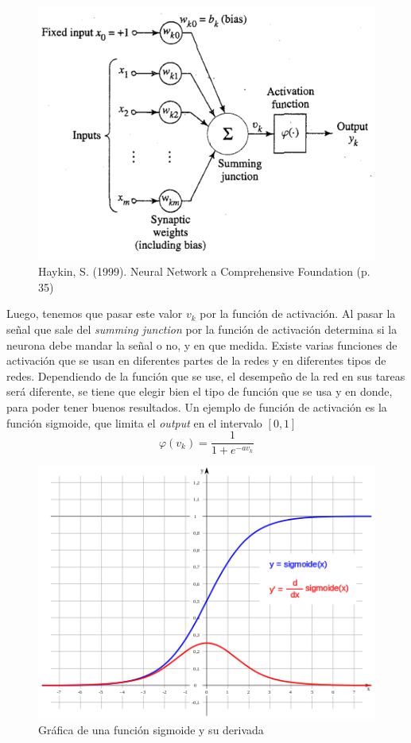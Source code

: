 \documentclass[14pt,a4paper]{report}
\begin{document}
 \begin{figure}[h]
  \centering
  \includegraphics[scale=0.8]{../artificial-neural-fixed-input.png} 
  \caption{Haykin, S. (1999). Neural Network a Comprehensive Foundation (p. 35)}
  \label{fig:neural-network}
\end{figure}


Luego, tenemos que pasar este valor $v_{k}$ por la función de activación. Al pasar la señal que sale del \textit{summing junction} por la función de activación determina si la neurona debe mandar la señal o no, y en que medida. Existe varias funciones de activación que se usan en diferentes partes de la redes y en diferentes tipos de redes. Dependiendo de la función que se use, el desempeño de la red en sus tareas será diferente, se tiene que elegir bien el tipo de función que se usa y en donde, para poder tener buenos resultados. Un ejemplo de función de activación es la función sigmoide, que limita el \textit{output} en el intervalo $[0,1]$
$$
\varphi(v_{k})=\frac{1}{1+e^{-av_{k}}}
$$
 \begin{figure}[h]
  \centering
  \includegraphics[scale=0.4]{../sigmoide.png}
  \caption{Gráfica de una función sigmoide y su derivada}
  \label{fig:neural-network}
\end{figure}
\end{document}
